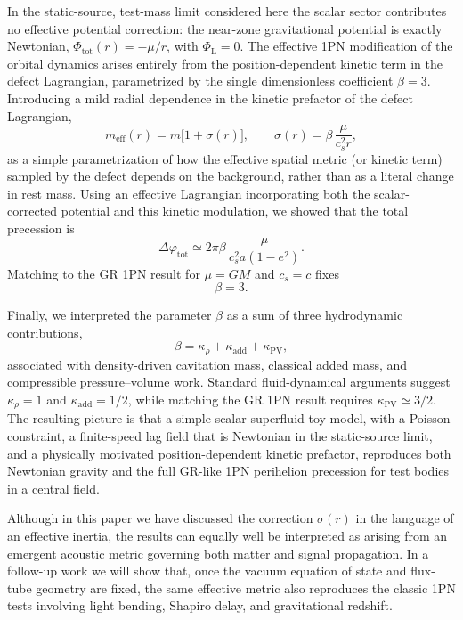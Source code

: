 \documentclass[11pt]{article}
\newcommand{\cS}{c_s}
\newcommand{\PhiL}{\Phi_{\mathrm{L}}}
\begin{document}
In the static-source, test-mass limit considered here the scalar sector contributes no effective potential correction: the near-zone gravitational potential is exactly Newtonian, $\Phi_{\mathrm{tot}}(r) = -\mu/r$, with $\PhiL = 0$. The effective 1PN modification of the orbital dynamics arises entirely from the position-dependent kinetic term in the defect Lagrangian, parametrized by the single dimensionless coefficient $\beta = 3$. Introducing a mild radial dependence in the kinetic prefactor of the defect Lagrangian,
\begin{equation}
  m_{\mathrm{eff}}(r) = m\bigl[1 + \sigma(r)\bigr],
  \qquad
  \sigma(r) = \beta\,\frac{\mu}{\cS^2 r},
\end{equation}
as a simple parametrization of how the effective spatial metric (or kinetic term) sampled by the defect depends on the background, rather than as a literal change in rest mass. Using an effective Lagrangian incorporating both the scalar-corrected potential and this kinetic modulation, we showed that the total precession is
\begin{equation}
  \Delta \varphi_{\mathrm{tot}}
  \simeq 2\pi\beta\,\frac{\mu}{\cS^2 a (1-e^2)}.
\end{equation}
Matching to the GR 1PN result for $\mu = GM$ and $\cS = c$ fixes
\begin{equation}
  \beta = 3.
\end{equation}

Finally, we interpreted the parameter $\beta$ as a sum of three hydrodynamic contributions,
\begin{equation}
  \beta = \kappa_\rho + \kappa_{\mathrm{add}} + \kappa_{\mathrm{PV}},
\end{equation}
associated with density-driven cavitation mass, classical added mass, and compressible pressure--volume work. Standard fluid-dynamical arguments suggest $\kappa_\rho = 1$ and $\kappa_{\mathrm{add}} = 1/2$, while matching the GR 1PN result requires $\kappa_{\mathrm{PV}} \simeq 3/2$. The resulting picture is that a simple scalar superfluid toy model, with a Poisson constraint, a finite-speed lag field that is Newtonian in the static-source limit, and a physically motivated position-dependent kinetic prefactor, reproduces both Newtonian gravity and the full GR-like 1PN perihelion precession for test bodies in a central field.

Although in this paper we have discussed the correction $\sigma(r)$ in the language of an
effective inertia, the results can equally well be interpreted as arising from an emergent
acoustic metric governing both matter and signal propagation. In a follow-up work we will show
that, once the vacuum equation of state and flux-tube geometry are fixed, the same effective
metric also reproduces the classic 1PN tests involving light bending, Shapiro delay, and
gravitational redshift.
\end{document}

